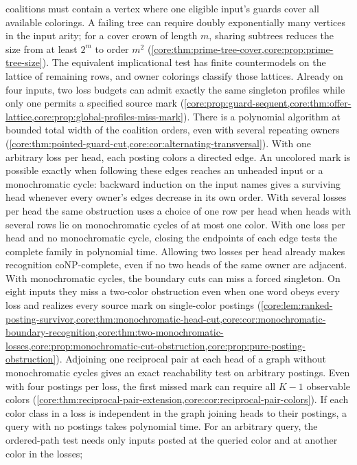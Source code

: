 coalitions must contain a vertex where one eligible input's guards
cover all available colorings. A failing tree can require doubly
exponentially many vertices in the input arity; for a cover crown
of length $m$, sharing subtrees reduces the size from at least $2^m$
to order $m^2$ (\cref{core:thm:prime-tree-cover,core:prop:prime-tree-size}).
The equivalent implicational test has finite countermodels on the
lattice of remaining rows, and owner colorings classify those lattices.
Already on four inputs, two loss budgets can admit exactly the same
singleton profiles while only one permits a specified source mark
(\cref{core:prop:guard-sequent,core:thm:offer-lattice,core:prop:global-profiles-miss-mark}). There is a polynomial algorithm at
bounded total width of the coalition orders, even with several repeating
owners (\cref{core:thm:pointed-guard-cut,core:cor:alternating-transversal}).
With one arbitrary loss per head, each posting colors a directed
edge. An uncolored mark is possible exactly when following these
edges reaches an unheaded input or a monochromatic cycle: backward
induction on the input names gives a surviving head whenever every
owner's edges decrease in its own order. With several losses per
head the same obstruction uses a choice of one row per head when
heads with several rows lie on monochromatic cycles of at most one color.
With one loss per head and no monochromatic cycle, closing the endpoints
of each edge tests the complete family in polynomial time. Allowing two losses per
head already makes recognition coNP-complete, even if no two heads
of the same owner are adjacent. With monochromatic cycles, the
boundary cuts can miss a forced singleton. On eight inputs they
miss a two-color obstruction even when one word obeys every loss
and realizes every source mark on single-color postings
(\cref{core:lem:ranked-posting-survivor,core:thm:monochromatic-head-cut,core:cor:monochromatic-boundary-recognition,core:thm:two-monochromatic-losses,core:prop:monochromatic-cut-obstruction,core:prop:pure-posting-obstruction}).
Adjoining one reciprocal pair at each head of a graph without
monochromatic cycles gives an exact reachability test on arbitrary
postings. Even with four postings per loss, the first missed mark
can require all $K-1$ observable colors
(\cref{core:thm:reciprocal-pair-extension,core:cor:reciprocal-pair-colors}).
If each color class in a loss is independent in the graph joining
heads to their postings, a query with no postings takes polynomial
time. For an arbitrary query, the ordered-path test needs only
inputs posted at the queried color and at another color in the losses;
